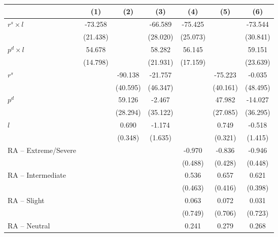 \begin{tabular}{l*{6}{c}}
\hline\hline
                    &\multicolumn{1}{c}{(1)}&\multicolumn{1}{c}{(2)}&\multicolumn{1}{c}{(3)}&\multicolumn{1}{c}{(4)}&\multicolumn{1}{c}{(5)}&\multicolumn{1}{c}{(6)}\\
\hline
$r^s \times l$      &     -73.258&            &     -66.589&     -75.425&            &     -73.544\\
                    &    (21.438)&            &    (28.020)&    (25.073)&            &    (30.841)\\
$p^d \times l$      &      54.678&            &      58.282&      56.145&            &      59.151\\
                    &    (14.798)&            &    (21.931)&    (17.159)&            &    (23.639)\\
$r^s$               &            &     -90.138&     -21.757&            &     -75.223&      -0.035\\
                    &            &    (40.595)&    (46.347)&            &    (40.161)&    (48.495)\\
$p^d$               &            &      59.126&      -2.467&            &      47.982&     -14.027\\
                    &            &    (28.294)&    (35.122)&            &    (27.085)&    (36.295)\\
$l$                 &            &       0.690&      -1.174&            &       0.749&      -0.518\\
                    &            &     (0.348)&     (1.635)&            &     (0.321)&     (1.415)\\
RA -- Extreme/Severe&            &            &            &      -0.970&      -0.836&      -0.946\\
                    &            &            &            &     (0.488)&     (0.428)&     (0.448)\\
RA -- Intermediate  &            &            &            &       0.536&       0.657&       0.621\\
                    &            &            &            &     (0.463)&     (0.416)&     (0.398)\\
RA -- Slight        &            &            &            &       0.063&       0.072&       0.031\\
                    &            &            &            &     (0.749)&     (0.706)&     (0.723)\\
RA -- Neutral       &            &            &            &       0.241&       0.279&       0.268\\

\end{tabular}
